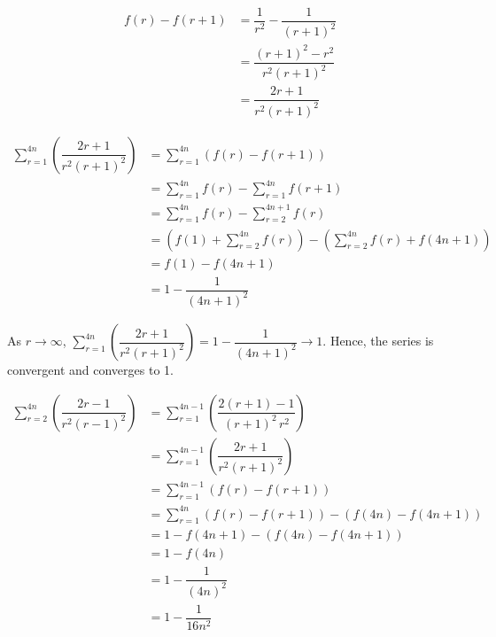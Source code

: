 \documentclass{echw}
\begin{document}
    \solution
        \begin{align*}
            f(r) - f(r+1) &= \dfrac1{r^2} - \dfrac1{(r+1)^2}\\
            &= \dfrac{(r+1)^2 - r^2}{r^2(r+1)^2}\\
            &= \dfrac{2r+1}{r^2(r+1)^2}
        \end{align*}


        \begin{align*}
            \sum\limits_{r=1}^{4n} \left(\dfrac{2r+1}{r^2(r+1)^2}\right) &= \sum\limits_{r=1}^{4n} (f(r) - f(r+1))\\
            &= \sum\limits_{r=1}^{4n} f(r) - \sum\limits_{r=1}^{4n} f(r+1)\\
            &= \sum\limits_{r=1}^{4n} f(r) - \sum\limits_{r=2}^{4n+1} f(r)\\
            &= \left(f(1) + \sum\limits_{r=2}^{4n} f(r)\right) - \left(\sum\limits_{r=2}^{4n} f(r) + f(4n+1)\right)\\
            &= f(1) - f(4n+1)\\
            &= 1 - \dfrac{1}{(4n+1)^2}
        \end{align*}

        As $r \rightarrow \infty$, $ \sum\limits_{r=1}^{4n} \left(\dfrac{2r+1}{r^2(r+1)^2}\right) = 1 - \dfrac{1}{(4n+1)^2} \rightarrow 1$. Hence, the series is convergent and converges to 1.


        \begin{align*}
            \sum\limits_{r=2}^{4n} \left(\dfrac{2r-1}{r^2(r-1)^2}\right) &= \sum\limits_{r=1}^{4n-1} \left(\dfrac{2(r+1)-1}{(r+1)^2 \, r^2}\right)\\
            &= \sum\limits_{r=1}^{4n-1} \left(\dfrac{2r+1}{r^2(r+1)^2}\right)\\
            &= \sum\limits_{r=1}^{4n-1} (f(r) - f(r+1))\\
            &= \sum\limits_{r=1}^{4n} (f(r) - f(r+1)) - (f(4n) - f(4n+1))\\
            &= 1 - f(4n+1) - (f(4n) - f(4n+1))\\
            &= 1 - f(4n)\\
            &= 1 - \dfrac1{(4n)^2}\\
            &= 1 - \dfrac1{16n^2}
        \end{align*}
\end{document}
